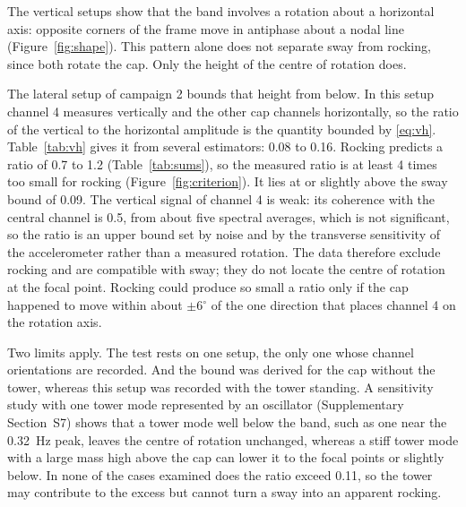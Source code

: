 \documentclass[11pt]{article}
\newcommand{\degr}{$^{\circ}$}
\begin{document}
The vertical setups show that the band involves a rotation about a horizontal axis: opposite corners of the frame move in antiphase about a nodal line (Figure~\ref{fig:shape}). This pattern alone does not separate sway from rocking, since both rotate the cap. Only the height of the centre of rotation does.

The lateral setup of campaign 2 bounds that height from below. In this setup channel 4 measures vertically and the other cap channels horizontally, so the ratio of the vertical to the horizontal amplitude is the quantity bounded by \eqref{eq:vh}. Table~\ref{tab:vh} gives it from several estimators: 0.08 to 0.16. Rocking predicts a ratio of 0.7 to 1.2 (Table~\ref{tab:sums}), so the measured ratio is at least 4 times too small for rocking (Figure~\ref{fig:criterion}). It lies at or slightly above the sway bound of 0.09. The vertical signal of channel 4 is weak: its coherence with the central channel is 0.5, from about five spectral averages, which is not significant, so the ratio is an upper bound set by noise and by the transverse sensitivity of the accelerometer rather than a measured rotation. The data therefore exclude rocking and are compatible with sway; they do not locate the centre of rotation at the focal point. Rocking could produce so small a ratio only if the cap happened to move within about $\pm6$\degr{} of the one direction that places channel 4 on the rotation axis.

Two limits apply. The test rests on one setup, the only one whose channel orientations are recorded. And the bound was derived for the cap without the tower, whereas this setup was recorded with the tower standing. A sensitivity study with one tower mode represented by an oscillator (Supplementary Section~S7) shows that a tower mode well below the band, such as one near the 0.32~Hz peak, leaves the centre of rotation unchanged, whereas a stiff tower mode with a large mass high above the cap can lower it to the focal points or slightly below. In none of the cases examined does the ratio exceed 0.11, so the tower may contribute to the excess but cannot turn a sway into an apparent rocking.
\end{document}
